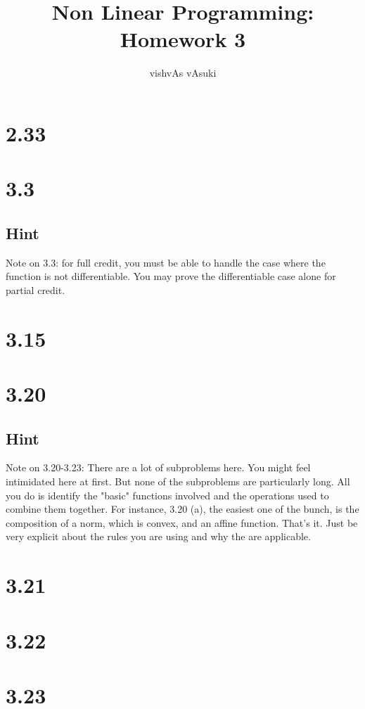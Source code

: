 \documentclass{article}
\title{Non Linear Programming: Homework 3}
\author{vishvAs vAsuki}
\begin{document}
\maketitle

\section{2.33}

\section{3.3}
\subsection{Hint}
Note on 3.3: for full credit, you must be able to handle the case where the function is not differentiable. You may prove the differentiable case alone for partial credit.


\section{3.15}

\section{3.20}
\subsection{Hint}
Note on 3.20-3.23: There are a lot of subproblems here. You might feel intimidated here at first. But none of the subproblems are particularly long. All you do is identify the "basic" functions involved and the operations used to combine them together. For instance, 3.20 (a), the easiest one of the bunch, is the composition of a norm, which is convex, and an affine function. That's it. Just be very explicit about the rules you are using and why the are applicable.


\section{3.21}

\section{3.22}

\section{3.23}



% 
% 
\end{document}

